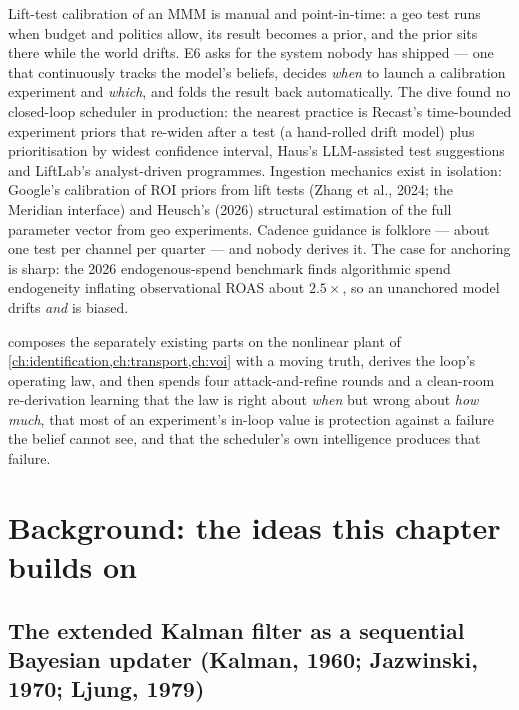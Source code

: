 Lift-test calibration of an MMM is manual and point-in-time: a geo test runs when budget and politics allow, its result becomes a prior, and the prior sits there while the world drifts. E6 asks for the system nobody has shipped --- one that continuously tracks the model's beliefs, decides \emph{when} to launch a calibration experiment and \emph{which}, and folds the result back automatically. The dive found no closed-loop scheduler in production: the nearest practice is Recast's time-bounded experiment priors that re-widen after a test (a hand-rolled drift model) plus prioritisation by widest confidence interval, Haus's LLM-assisted test suggestions and LiftLab's analyst-driven programmes. Ingestion mechanics exist in isolation: Google's calibration of ROI priors from lift tests (Zhang et al., 2024; the Meridian interface) and Heusch's (2026) structural estimation of the full parameter vector from geo experiments. Cadence guidance is folklore --- about one test per channel per quarter --- and nobody derives it. The case for anchoring is sharp: the 2026 endogenous-spend benchmark finds algorithmic spend endogeneity inflating observational ROAS about $2.5\times$, so an unanchored model drifts \emph{and} is biased.

 composes the separately existing parts on the nonlinear plant of \cref{ch:identification,ch:transport,ch:voi} with a moving truth, derives the loop's operating law, and then spends four attack-and-refine rounds and a clean-room re-derivation learning that the law is right about \emph{when} but wrong about \emph{how much}, that most of an experiment's in-loop value is protection against a failure the belief cannot see, and that the scheduler's own intelligence produces that failure.

\section{Background: the ideas this chapter builds on}

\subsection{The extended Kalman filter as a sequential Bayesian updater (Kalman, 1960; Jazwinski, 1970; Ljung, 1979)}


